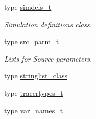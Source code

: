 \begin{DoxyCompactItemize}
type \mbox{\hyperlink{structsimulationglobals__mod_1_1simdefs__t}{simdefs\+\_\+t}}
\begin{DoxyCompactList}\small\item\em Simulation definitions class. \end{DoxyCompactList}\item 
type \mbox{\hyperlink{structsimulationglobals__mod_1_1src__parm__t}{src\+\_\+parm\+\_\+t}}
\begin{DoxyCompactList}\small\item\em Lists for Source parameters. \end{DoxyCompactList}\item 
type \mbox{\hyperlink{structsimulationglobals__mod_1_1stringlist__class}{stringlist\+\_\+class}}
\item 
type \mbox{\hyperlink{structsimulationglobals__mod_1_1tracertypes__t}{tracertypes\+\_\+t}}
\item 
type \mbox{\hyperlink{structsimulationglobals__mod_1_1var__names__t}{var\+\_\+names\+\_\+t}}
\end{DoxyCompactItemize}
